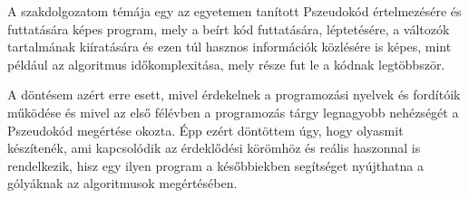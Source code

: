 A szakdolgozatom témája egy az egyetemen tanított Pszeudokód értelmezésére és futtatására képes program, mely a beírt kód futtatására, léptetésére, a változók tartalmának kiíratására és ezen túl hasznos információk közlésére is képes, mint például az algoritmus időkomplexitása, mely része fut le a kódnak legtöbbször. 

A döntésem azért erre esett, mivel érdekelnek a programozási nyelvek és fordítóik működése és mivel az első félévben a programozás tárgy legnagyobb nehézségét a Pszeudokód megértése okozta. Épp ezért döntöttem úgy, hogy olyasmit készítenék, ami kapcsolódik az érdeklődési körömhöz és reális haszonnal is rendelkezik, hisz egy ilyen program a későbbiekben segítséget nyújthatna a gólyáknak az algoritmusok megértésében.